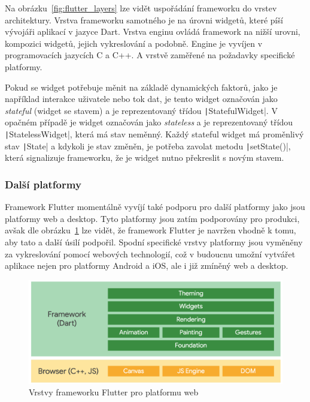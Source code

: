 Na obrázku~\ref{fig:flutter_layers} lze vidět uspořádání frameworku do vrstev
architektury.
Vrstva frameworku samotného je na úrovni widgetů,
které píší vývojáři aplikací v jazyce Dart.
Vrstva enginu ovládá framework na nižší urovni, kompozici widgetů,
jejich vykreslování a podobně.
Engine je vyvíjen v programovacích jazycích C a C++.
A vrstvě zaměřené na požadavky specifické
platformy.~\cite{flutter_technical_overview}

Pokud se widget potřebuje měnit na základě dynamických faktorů,
jako je například interakce uživatele nebo tok dat,
je tento widget označován jako \emph{stateful} (widget se stavem) a je
reprezentovaný třídou \texttt|StatefulWidget|.
V opačném případě je widget označován jako \emph{stateless} a je 
reprezentovaný třídou \texttt|StatelessWidget|,
která má stav neměnný.
Každý stateful widget má proměnlivý stav \texttt|State|
a kdykoli je stav změněn,
je potřeba zavolat metodu \texttt|setState()|,
která signalizuje frameworku,
že je widget nutno překreslit s novým stavem.~\cite{flutter_technical_overview}

\subsubsection*{Další platformy}

Framework Flutter momentálně vyvíjí také podporu pro
další platformy jako jsou platformy web a desktop.
Tyto platformy jsou zatím podporovány pro produkci,
avšak dle obrázku~\ref{fig:flutter_layers_web} lze vidět,
že framework Flutter je navržen vhodně k tomu,
aby tato a další úsilí podpořil.
Spodní specifické vrstvy platformy jsou vyměněny za vykreslování pomocí
webových technologií,
což v budoucnu umožní vytvářet aplikace nejen pro platformy Android a iOS,
ale i již zmíněný web a desktop.~\cite{flutter_web, flutter_desktop} 

\begin{figure}[ht!]
    \centering
    \includegraphics[width=\linewidth]{assets/technology-research/framework/flutter_overview_web.png}
    \caption{Vrstvy frameworku Flutter pro platformu web
    ~\cite{flutter_web}}
    \label{fig:flutter_layers_web}
\end{figure}

